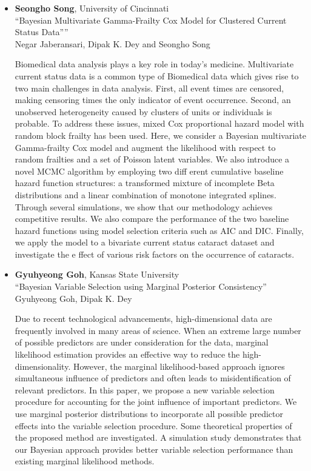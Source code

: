\begin{itemize}
\item \textbf{Seongho Song}, University of Cincinnati \\
``Bayesian Multivariate Gamma-Frailty Cox Model for Clustered Current Status Data”'' \\
Negar Jaberansari, Dipak K. Dey and Seongho Song


Biomedical data analysis plays a key role in today's medicine. Multivariate current status data is a common type of Biomedical data which gives rise to two main challenges in data analysis. First, all event times are censored, making censoring times the only indicator of event occurrence. Second, an unobserved heterogeneity caused by clusters of units or individuals is probable. To address these issues, mixed Cox proportional hazard model with random block frailty has been used. Here, we consider a Bayesian multivariate Gamma-frailty Cox model and augment the likelihood with respect to random frailties and a set of Poisson latent variables. We also introduce a novel MCMC algorithm by employing two diff erent cumulative baseline hazard function structures: a transformed mixture of incomplete Beta distributions and a linear combination of monotone integrated splines. Through several simulations, we show that our methodology achieves competitive results. We also compare the performance of the two baseline hazard functions using model selection criteria such as AIC and DIC. Finally, we apply the model to a bivariate current status cataract dataset and investigate the e ffect of various risk factors on the occurrence of
cataracts.

\item \textbf{Gyuhyeong Goh}, Kansas State University \\
``Bayesian Variable Selection using Marginal Posterior Consistency'' \\
Gyuhyeong Goh, Dipak K. Dey


Due to recent technological advancements, high-dimensional data are frequently involved in many areas of science. When an extreme large number of possible predictors are under consideration for the data, marginal likelihood estimation provides an effective way to reduce the high-dimensionality. However, the marginal likelihood-based approach ignores simultaneous influence of predictors and often leads to misidentification of relevant predictors. In this paper, we propose a new variable selection procedure for accounting for the joint influence of important predictors. We use marginal posterior distributions to incorporate all possible predictor effects into the variable selection procedure. Some theoretical properties of the proposed method are investigated. A simulation study demonstrates that our Bayesian approach provides better variable selection performance than existing marginal likelihood methods.

\end{itemize}

